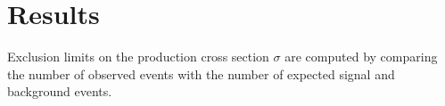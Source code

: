 \section{Results}

Exclusion limits on the production cross section $\sigma$ are computed by
comparing the number of observed events with the number of expected signal
and background events. 
